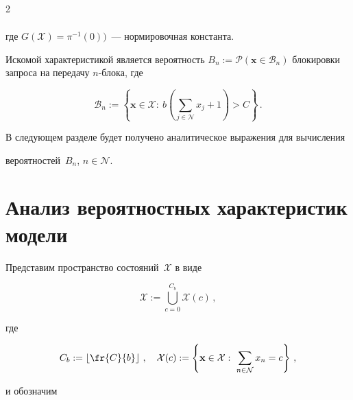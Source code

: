 \begin{multicols}{2}
\begin{multline*}
  \end{multline*} %


  где $G({\mathcal X}) =\pi^{-1}(0))$~--- нормировочная константа.


  


  Искомой характеристикой является вероятность $B_n := {\mathcal P}(\mathbf{x}\in 


{\mathcal B}_n)$ блокировки запроса на передачу $n$-блока, где 


$${\mathcal B}_n := 


  \left\{ \mathbf{x}\in {\mathcal X}:\ b\left ( \sum\limits_{j\in{\mathcal N}} x_j+1\right ) >C\right\}\,.


  $$


   В следующем разделе будет получено аналитическое выражения для вычисления 


вероятностей~$B_n$, $n\in {\mathcal N}$.





\vspace*{-2pt}


  


  \section{Анализ вероятностных характеристик модели}


  


  Представим пространство состояний~${\mathcal X}$ в виде 


  $$


  {\mathcal X} :=  \bigcup\limits_{c=0}^{C_b} {\mathcal X}(c)\,,


  $$ 


  где 




  


  \noindent


  $$


  C_b := \left\lfloor \fr{C}{b}\right\rfloor\,,\quad {\mathcal X}(c) :=  \left\{ 


\mathbf{x}\in {\mathcal X}:\ \sum\limits_{n\in {\mathcal N}} x_n=c\right\}\,,


$$ 


и обозначим 


$$



\end{multicols}
